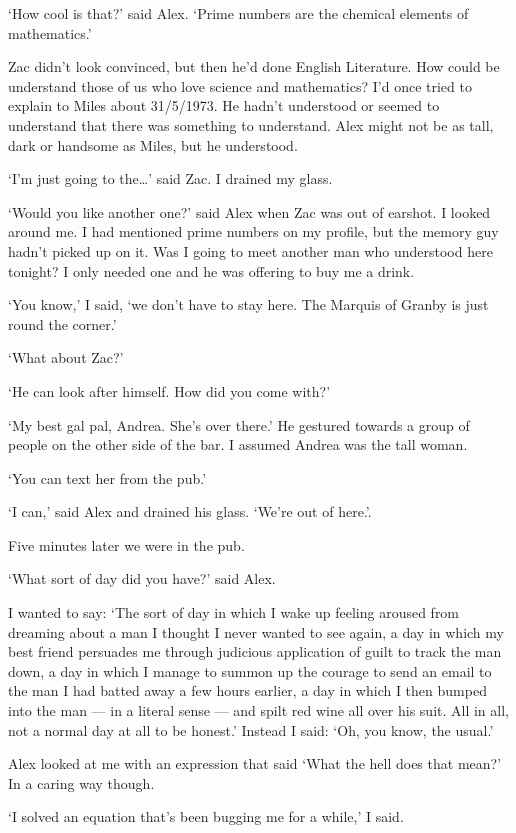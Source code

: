 `How cool is that?' said Alex. `Prime numbers are the chemical
elements of mathematics.'

Zac didn't look convinced, but then he'd done English Literature.
How could be understand those of us who love science and
mathematics? I'd once tried to explain to Miles about 31/5/1973. He
hadn't understood or seemed to understand that there was something
to understand. Alex might not be as tall, dark or handsome as Miles,
but he understood.

`I'm just going to the\dots' said Zac. I drained my glass.

`Would you like another one?' said Alex when Zac was out of earshot.
I looked around me. I had mentioned prime numbers on my profile, but
the memory guy hadn't picked up on it. Was I going to meet another
man who understood here tonight? I only needed one and he was
offering to buy me a drink.

`You know,' I said, `we don't have to stay here. The Marquis of
Granby is just round the corner.'

`What about Zac?'

`He can look after himself. How did you come with?'

`My best gal pal, Andrea. She's over there.' He gestured towards a group of people on the other side of the bar. I assumed Andrea was the tall woman.

`You can text her from the pub.'

`I can,' said Alex and drained his glass. `We're out of here.'.

Five minutes later we were in the pub.

`What sort of day did you have?' said Alex.

I wanted to say: `The sort of day in which I wake up feeling aroused
from dreaming about a man I thought I never wanted to see again, a
day in which my best friend persuades me through judicious
application of guilt to track the man down, a day in which I manage
to summon up the courage to send an email to the man I had batted
away a few hours earlier, a day in which I then bumped into the man
--- in a literal sense --- and spilt red wine all over his suit. All in all, not a normal day at all to be honest.'
Instead I said: `Oh, you know, the usual.'

Alex looked at me with an expression that said `What the hell does
that mean?' In a caring way though.

`I solved an equation that's been bugging me for a while,' I said.

